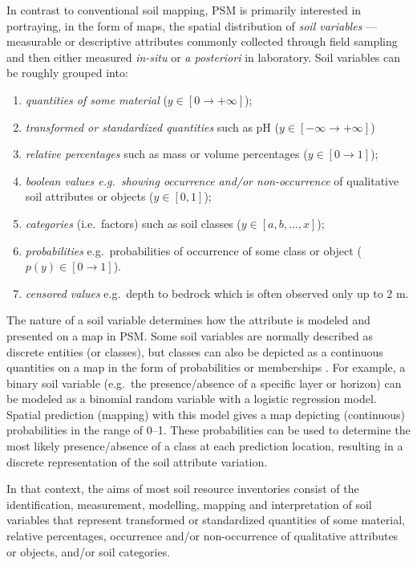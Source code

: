 \documentclass[11pt]{krantz}
\theoremstyle{definition}
\theoremstyle{definition}
\theoremstyle{definition}
\theoremstyle{remark}
\begin{document}
In contrast to conventional soil mapping, PSM is primarily interested in
portraying, in the form of maps, the spatial distribution of \emph{soil
variables} --- measurable or descriptive attributes commonly collected
through field sampling and then either measured \emph{in-situ} or
\emph{a posteriori} in laboratory. Soil variables can be roughly grouped
into:

\begin{enumerate}
\def\labelenumi{\arabic{enumi}.}
\item
  \emph{quantities of some material}
  (\(y \in [0 \rightarrow +\infty]\));
\item
  \emph{transformed or standardized quantities} such as pH
  (\(y \in [-\infty \rightarrow +\infty]\))
\item
  \emph{relative percentages} such as mass or volume percentages
  (\(y \in [0 \rightarrow 1]\));
\item
  \emph{boolean values e.g.~showing occurrence and/or non-occurrence} of
  qualitative soil attributes or objects (\(y \in [0,1]\));
\item
  \emph{categories} (i.e.~factors) such as soil classes
  (\(y \in [a,b,\ldots,x]\));
\item
  \emph{probabilities} e.g.~probabilities of occurrence of some class or
  object (\(p(y) \in [0 \rightarrow 1]\)).
\item
  \emph{censored values} e.g.~depth to bedrock which is often observed
  only up to 2 m.
\end{enumerate}

The nature of a soil variable determines how the attribute is modeled
and presented on a map in PSM. Some soil variables are normally
described as discrete entities (or classes), but classes can also be
depicted as a continuous quantities on a map in the form of
probabilities or memberships
\citep{DeGruijter1997Geoderma, McBratney2003Geoderma, Kempen2009Geoderma, Odgers201130}.
For example, a binary soil variable (e.g.~the presence/absence of a
specific layer or horizon) can be modeled as a binomial random variable
with a logistic regression model. Spatial prediction (mapping) with this
model gives a map depicting (continuous) probabilities in the range of
0--1. These probabilities can be used to determine the most likely
presence/absence of a class at each prediction location, resulting in a
discrete representation of the soil attribute variation.

In that context, the aims of most soil resource inventories consist of
the identification, measurement, modelling, mapping and interpretation
of soil variables that represent transformed or standardized quantities
of some material, relative percentages, occurrence and/or non-occurrence
of qualitative attributes or objects, and/or soil categories.
\end{document}
